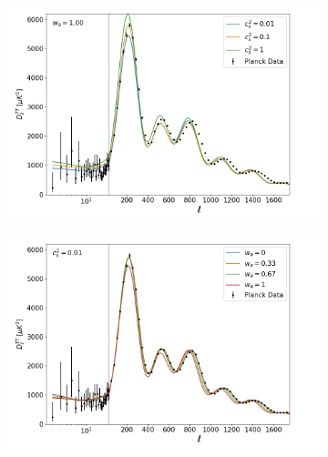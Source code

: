 \documentclass[openany,a4paper,12pt,oneside]{book}
\begin{document}
\begin{spacing}{1.5}
\begin{figure}
{\begin{subfigure}[t]{.43\paperwidth}
		\includegraphics[width=\linewidth]{Imagens/full_doublscale_Wafixo1.00.png}
		\caption{}
		\label{fig:dark_energy_wa=1}
	\end{subfigure}
	\hfill
	\begin{subfigure}[t]{.43\paperwidth}
		\centering
		\includegraphics[width=\linewidth]{Imagens/full_doublscale_Cs2fixo0.01.png}
		\caption{}
		\label{fig:dark_energy_cs2=0.01}
	\end{subfigure}
}
\end{figure}
\end{spacing}
\end{document}
